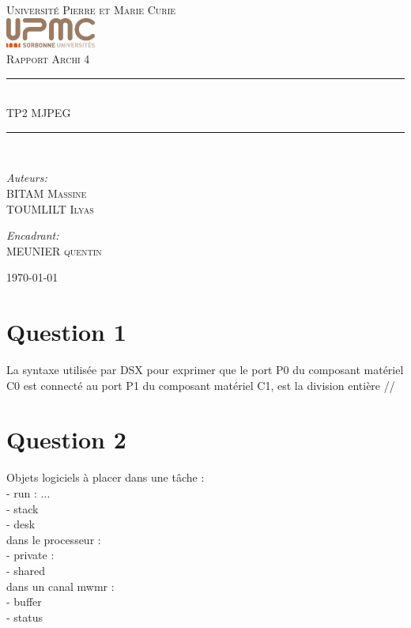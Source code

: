 \documentclass[12pt]{article}
\newcommand{\HRule}{\rule{\linewidth}{0.5mm}}
\begin{document}
\begin{titlepage}
  \begin{center}
    \textsc{\LARGE Université Pierre et Marie Curie}\\[1.5cm]
    \includegraphics[height=1cm]{upmc.png}\\[1.5cm]
    \textsc{\Large Rapport Archi 4 }\\[2cm]
    \HRule \\[1cm]
    \textsc{\huge TP2 MJPEG }\\[0.5cm]
    \HRule \\[1cm]
    \noindent
    \begin{minipage}[t]{0.55\textwidth}
      \begin{flushleft} \large
        \emph{Auteurs:}\\
        BITAM \textsc{Massine}\\
        TOUMLILT \textsc{Ilyas}
      \end{flushleft}
    \end{minipage}%
    \begin{minipage}[t]{0.47\textwidth}
      \begin{flushright} \large
        \emph{Encadrant:} \\
        MEUNIER \textsc{quentin}
      \end{flushright}
    \end{minipage}
    \vfill
    {\large \today}
  \end{center}
\end{titlepage}

\section*{Question 1}
La syntaxe utilisée par DSX pour exprimer que le port P0 du composant matériel C0 est connecté au 
port P1 du composant matériel C1, est la division entière //

\section*{Question 2}
Objets logiciels à placer dans une tâche :\\
- run : ...\\
- stack\\
- desk \\
dans le processeur :\\
- private :\\
- shared \\
dans un canal mwmr :\\
- buffer\\
- status\\
\end{document}
